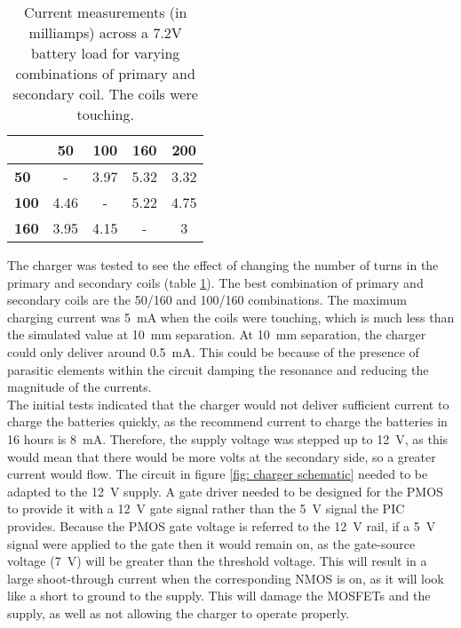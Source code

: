 \begin{table}[htbp]
	\begin{center}
	\begin{tabular}{|l|*{4}{c|}}
		\hline
		\backslashbox{\textbf{Primary Turns}}{\textbf{Secondary Turns}} & \textbf{50} & \textbf{100} & \textbf{160} & \textbf{200} \\
		\hline
		\textbf{50} & - & 3.97 & 5.32 & 3.32 \\
		\hline
		\textbf{100} & 4.46 & - & 5.22 & 4.75 \\
		\hline
		\textbf{160} & 3.95 & 4.15 & - & 3\\
		\hline
	\end{tabular}
	\caption{Current measurements (in milliamps) across a 7.2V battery load for varying combinations of primary and secondary coil. The coils were touching.}
	\label{tab: coil combinations}
	\end{center}
\end{table}

The charger was tested to see the effect of changing the number of turns in the primary and secondary coils (table \ref{tab: coil combinations}). The best combination of primary and secondary coils are the 50/160 and 100/160 combinations. The maximum charging current was \SI{5}{\milli\ampere} when the coils were touching, which is much less than the simulated value at \SI{10}{\milli\metre} separation. At \SI{10}{\milli\metre} separation, the charger could only deliver around \SI{0.5}{\milli\ampere}. This could be because of the presence of parasitic elements within the circuit damping the resonance and reducing the magnitude of the currents. \\ 



The initial tests indicated that the charger would not deliver sufficient current to charge the batteries quickly, as the recommend current to charge the batteries in 16 hours is \SI{8}{\milli\ampere}. Therefore, the supply voltage was stepped up to \SI{12}{\volt}, as this would mean that there would be more volts at the secondary side, so a greater current would flow. The circuit in figure \ref{fig: charger schematic} needed to be adapted to the \SI{12}{\volt} supply. A gate driver needed to be designed for the PMOS to provide it with a \SI{12}{\volt} gate signal rather than the \SI{5}{\volt} signal the PIC provides. Because the PMOS gate voltage is referred to the \SI{12}{\volt} rail, if a \SI{5}{\volt} signal were applied to the gate then it would remain on, as the gate-source voltage (\SI{7}{\volt}) will be greater than the threshold voltage. This will result in a large shoot-through current when the corresponding NMOS is on, as it will look like a short to ground to the supply. This will damage the MOSFETs and the supply, as well as not allowing the charger to operate properly. \\

